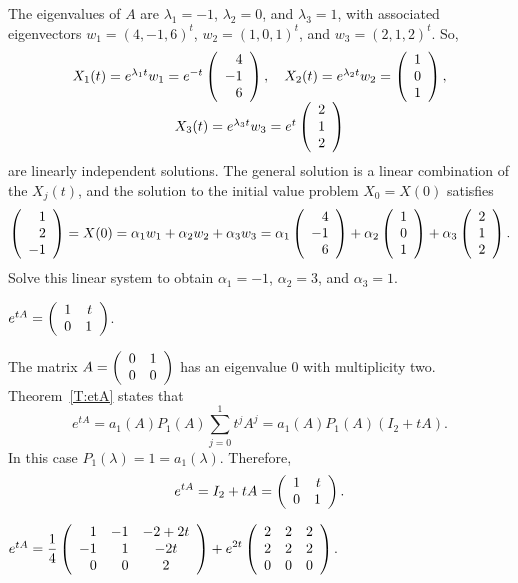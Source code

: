 \soln The eigenvalues of $A$ are $\lambda_1 = -1$, $\lambda_2 = 0$, and
$\lambda_3 = 1$, with associated eigenvectors $w_1 = (4,-1,6)^t$,
$w_2 = (1,0,1)^t$, and $w_3 = (2,1,2)^t$.  So,
\[
\begin{array}{c}
X_1(t) = e^{\lambda_1 t}w_1 = e^{-t}\left(\begin{array}{r} 4 \\ -1 \\ 6\end{array}\right), \quad
X_2(t) = e^{\lambda_2 t}w_2 = \left(\begin{array}{r} 1 \\ 0 \\ 1\end{array}\right), \\
X_3(t) = e^{\lambda_3 t}w_3 = e^t\left(\begin{array}{r} 2 \\ 1 \\ 2\end{array}\right)
\end{array}
\]
are linearly independent solutions.  The general solution is a linear
combination of the $X_j(t)$, and the solution to the initial value
problem $X_0 = X(0)$ satisfies
\[
\left(\begin{array}{r} 1 \\ 2 \\ -1\end{array}\right) = X(0) = \alpha_1w_1 + \alpha_2w_2 + \alpha_3w_3
= \alpha_1\left(\begin{array}{r} 4 \\ -1 \\ 6\end{array}\right) + \alpha_2\left(\begin{array}{r} 1 \\ 0 \\ 1\end{array}\right)
+ \alpha_3\left(\begin{array}{r} 2 \\ 1 \\ 2\end{array}\right).
\]
Solve this linear system to obtain $\alpha_1 = -1$,
$\alpha_2 = 3$, and $\alpha_3 = 1$.

 \ans $e^{tA} = \left(\begin{array}{rr} 1 & t\\ 0 &1\end{array}\right)$.

\soln The matrix $A = \left(\begin{array}{rr} 0 & 1\\ 0 &0\end{array}\right)$ has an eigenvalue $0$ with
multiplicity two.  Theorem~\ref{T:etA} states that 
\[
e^{tA} = a_1(A)P_1(A)\sum_{j=0}^1t^jA^j= a_1(A)P_1(A)(I_2+tA).
\]
In this case $P_1(\lambda)=1=a_1(\lambda)$.   Therefore,
\[
e^{tA} = I_2+tA = \left(\begin{array}{rr} 1 & t\\ 0 &1\end{array}\right).
\]

\newpage
{} \ans $e^{tA}= \displaystyle\frac{1}{4}\left(\begin{array}{rrc} 
1 & -1 & -2+2t\\ -1 & 1 & -2t \\ 0 & 0 & 2\end{array}\right) +e^{2t}\left(\begin{array}{rrr} 2 & 2 & 2\\  2 & 2 & 2 \\ 0 & 0 & 0 
\end{array}\right)$.

